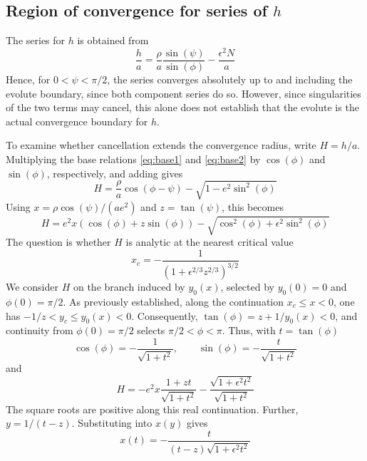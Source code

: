\documentclass[a4paper]{amsart}
\begin{document}
\subsection{Region of convergence for series of \texorpdfstring{$h$}{h}}\label{sec:conv_h}
The series for $h$ is obtained from
\begin{equation*}
\frac{h}{a}
=\frac{\rho}{a}\frac{\sin(\psi)}{\sin(\phi)}-\frac{\epsilon^2N}{a}
\end{equation*}
Hence, for $0<\psi<\pi/2$, the series converges absolutely up to and including the evolute boundary, since both component series do so. However, since singularities of the two terms may cancel, this alone does not establish that the evolute is the actual convergence boundary for $h$.

To examine whether cancellation extends the convergence radius, write $H=h/a$. Multiplying the base relations \eqref{eq:base1} and \eqref{eq:base2} by $\cos(\phi)$ and $\sin(\phi)$, respectively, and adding gives
\begin{equation*}
H=\frac{\rho}{a}\cos(\phi-\psi)
-\sqrt{1-e^2\sin^2(\phi)}
\end{equation*}
Using $x=\rho\cos(\psi)/(ae^2)$ and $z=\tan(\psi)$,
this becomes
\begin{equation*}
H=e^2x(\cos(\phi)+z\sin(\phi))-\sqrt{\cos^2(\phi)+\epsilon^2\sin^2(\phi)}
\end{equation*}
The question is whether $H$ is analytic at the nearest critical value
\begin{equation*}
x_c=-\frac{1}{(1+\epsilon^{2/3}z^{2/3})^{3/2}}
\end{equation*}
We consider $H$ on the branch induced by $y_0(x)$, selected by $y_0(0)=0$ and $\phi(0)=\pi/2$. As previously established, along the continuation $x_c\leq x<0$, one has $-1/z<y_c\leq y_0(x)<0$. Consequently, $\tan(\phi)=z+1/y_0(x)<0$, and continuity from $\phi(0)=\pi/2$ selects $\pi/2<\phi<\pi$. Thus, with $t=\tan(\phi)$
\begin{equation*}
\cos(\phi)=-\frac{1}{\sqrt{1+t^2}},\qquad\sin(\phi)=-\frac{t}{\sqrt{1+t^2}}
\end{equation*}
and
\begin{equation*}
H=-e^2x\frac{1+zt}{\sqrt{1+t^2}}-\frac{\sqrt{1+\epsilon^2t^2}}{\sqrt{1+t^2}}
\end{equation*}
The square roots are positive along this real continuation. Further, $y=1/(t-z)$. Substituting into $x(y)$ gives
\begin{equation*}
x(t)=-\frac{t}{(t-z)\sqrt{1+\epsilon^2t^2}}
\end{equation*}
\end{document}
